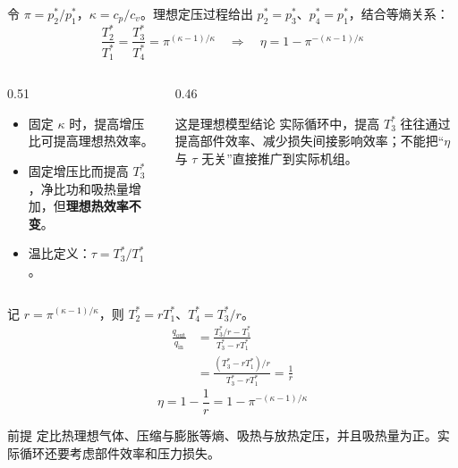 \begin{frame}[t,shrink]{}
令 \(\pi=p_2^*/p_1^*\)，\(\kappa=c_p/c_v\)。理想定压过程给出 \(p_2^*=p_3^*\)、\(p_4^*=p_1^*\)，结合等熵关系：
$$
\frac{T_2^*}{T_1^*}
=\frac{T_3^*}{T_4^*}
=\pi^{(\kappa-1)/\kappa}
\quad\Rightarrow\quad
\eta=1-\pi^{-(\kappa-1)/\kappa}
$$
\begin{columns}[T,onlytextwidth]
\begin{column}{0.51\textwidth}
  \begin{itemize}
    \item 固定 \(\kappa\) 时，提高增压比可提高理想热效率。
    \item 固定增压比而提高 \(T_3^*\)，净比功和吸热量增加，但\textbf{理想热效率不变}。
    \item 温比定义：\(\tau=T_3^*/T_1^*\)。
  \end{itemize}
\end{column}
\begin{column}{0.46\textwidth}
  \begin{amberbox}{这是理想模型结论}
  \small 实际循环中，提高 \(T_3^*\) 往往通过提高部件效率、减少损失间接影响效率；不能把“\(\eta\) 与 \(\tau\) 无关”直接推广到实际机组。
  \end{amberbox}
\end{column}
\end{columns}
\end{frame}

\begin{frame}[t,shrink]{}
记 \(r=\pi^{(\kappa-1)/\kappa}\)，则 \(T_2^*=rT_1^*\)、\(T_4^*=T_3^*/r\)。
$$
\begin{aligned}
\frac{q_{\mathrm{out}}}{q_{\mathrm{in}}}
&=\frac{T_3^*/r-T_1^*}{T_3^*-rT_1^*}\\
&=\frac{(T_3^*-rT_1^*)/r}{T_3^*-rT_1^*}
=\frac{1}{r}
\end{aligned}
$$
$$
\eta=1-\frac{1}{r}
=1-\pi^{-(\kappa-1)/\kappa}
$$
\begin{keybox}{前提}
\small 定比热理想气体、压缩与膨胀等熵、吸热与放热定压，并且吸热量为正。实际循环还要考虑部件效率和压力损失。
\end{keybox}
\end{frame}

